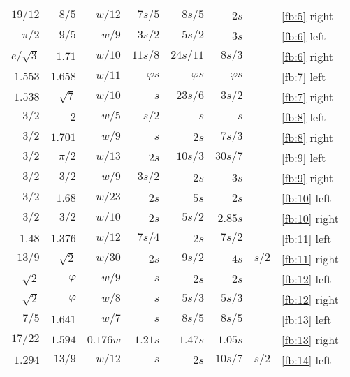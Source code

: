 \documentclass[10pt,letterpaper,extrafontsizes]{memoir}
\begin{document}
\begin{table}
\begin{tabular}{|r|r|rrrrr|l|}
$19/12$    & $8/5$   & $w/12$   & $7s/5$ & $8s/5$  & $2s$    &       & \ref{fb:5} right \\ %
$\pi/2$    & $9/5$   & $w/9$    & $3s/2$ & $5s/2$  & $3s$    &       & \ref{fb:6} left \\ %
$e/\sqrt{3}$ & $1.71$ & $w/10$  & $11s/8$ & $24s/11$ & $8s/3$ &      & \ref{fb:6} right \\ %
$1.553$    & $1.658$ & $w/11$   & $\varphi s$ & $\varphi s$ & $\varphi s$ & & \ref{fb:7} left \\ %
$1.538$    & $\sqrt{7}$ & $w/10$ & $s$   & $23s/6$ & $3s/2$  &       & \ref{fb:7} right \\ %
$3/2$      & $2$     & $w/5$    & $s/2$  & $s$     & $s$     &       & \ref{fb:8} left \\ %
$3/2$      & $1.701$ & $w/9$    & $s$    & $2s$    & $7s/3$  &       & \ref{fb:8} right \\ %
$3/2$      & $\pi/2$ & $w/13$   & $2s$   & $10s/3$ & $30s/7$ &       & \ref{fb:9} left \\ %
$3/2$      & $3/2$   & $w/9$    & $3s/2$ & $2s$    & $3s$    &       & \ref{fb:9} right \\ %
$3/2$      & $1.68$  & $w/23$   & $2s$   & $5s$    & $2s$    &       & \ref{fb:10} left \\ %
$3/2$      & $3/2$   & $w/10$   & $2s$   & $5s/2$  & $2.85s$ &       & \ref{fb:10} right \\ %
$1.48$     & $1.376$ & $w/12$   & $7s/4$ & $2s$    & $7s/2$  &       & \ref{fb:11} left \\ %
$13/9$     & $\sqrt{2}$ & $w/30$ & $2s$  & $9s/2$  & $4s$    & $s/2$ & \ref{fb:11} right \\ %
$\sqrt{2}$ & $\varphi$ & $w/9$  & $s$    & $2s$    & $2s$    &       & \ref{fb:12} left \\ %
$\sqrt{2}$ & $\varphi$ & $w/8$  & $s$    & $5s/3$  & $5s/3$  &       & \ref{fb:12} right \\ %
$7/5$      & $1.641$   & $w/7$  & $s$    & $8s/5$  & $8s/5$  &       & \ref{fb:13} left \\ %
$17/22$    & $1.594$ & $0.176w$ & $1.21s$ & $1.47s$ & $1.05s$ &      & \ref{fb:13} right \\ %
$1.294$    & $13/9$  & $w/12$   & $s$    & $2s$    & $10s/7$ & $s/2$ & \ref{fb:14} left \\ %

\end{tabular}
\end{table}
\end{document}
